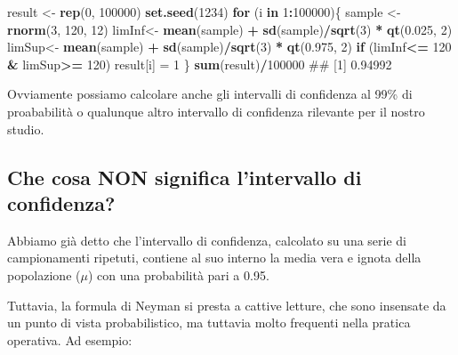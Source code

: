 \documentclass[a4paper,12pt,oneside]{book}
\newenvironment{Shaded}{\begin{snugshade}}{\end{snugshade}}
\newcommand{\KeywordTok}[1]{\textcolor[rgb]{0.13,0.29,0.53}{\textbf{#1}}}
\newcommand{\DecValTok}[1]{\textcolor[rgb]{0.00,0.00,0.81}{#1}}
\newcommand{\FloatTok}[1]{\textcolor[rgb]{0.00,0.00,0.81}{#1}}
\newcommand{\StringTok}[1]{\textcolor[rgb]{0.31,0.60,0.02}{#1}}
\newcommand{\ControlFlowTok}[1]{\textcolor[rgb]{0.13,0.29,0.53}{\textbf{#1}}}
\newcommand{\OperatorTok}[1]{\textcolor[rgb]{0.81,0.36,0.00}{\textbf{#1}}}
\newcommand{\NormalTok}[1]{#1}
\theoremstyle{definition}
\theoremstyle{definition}
\theoremstyle{definition}
\theoremstyle{remark}
\begin{document}
\begin{Shaded}
\begin{Highlighting}[]
\NormalTok{result <-}\StringTok{ }\KeywordTok{rep}\NormalTok{(}\DecValTok{0}\NormalTok{, }\DecValTok{100000}\NormalTok{)}
\KeywordTok{set.seed}\NormalTok{(}\DecValTok{1234}\NormalTok{)}
\ControlFlowTok{for}\NormalTok{ (i }\ControlFlowTok{in} \DecValTok{1}\OperatorTok{:}\DecValTok{100000}\NormalTok{)\{}
\NormalTok{  sample <-}\StringTok{ }\KeywordTok{rnorm}\NormalTok{(}\DecValTok{3}\NormalTok{, }\DecValTok{120}\NormalTok{, }\DecValTok{12}\NormalTok{)}
\NormalTok{  limInf<-}\StringTok{ }\KeywordTok{mean}\NormalTok{(sample) }\OperatorTok{+}\StringTok{ }\KeywordTok{sd}\NormalTok{(sample)}\OperatorTok{/}\KeywordTok{sqrt}\NormalTok{(}\DecValTok{3}\NormalTok{) }\OperatorTok{*}\StringTok{ }\KeywordTok{qt}\NormalTok{(}\FloatTok{0.025}\NormalTok{, }\DecValTok{2}\NormalTok{) }
\NormalTok{  limSup<-}\StringTok{ }\KeywordTok{mean}\NormalTok{(sample) }\OperatorTok{+}\StringTok{ }\KeywordTok{sd}\NormalTok{(sample)}\OperatorTok{/}\KeywordTok{sqrt}\NormalTok{(}\DecValTok{3}\NormalTok{) }\OperatorTok{*}\StringTok{ }\KeywordTok{qt}\NormalTok{(}\FloatTok{0.975}\NormalTok{, }\DecValTok{2}\NormalTok{) }
  \ControlFlowTok{if}\NormalTok{ (limInf}\OperatorTok{<=}\StringTok{ }\DecValTok{120} \OperatorTok{&}\StringTok{ }\NormalTok{limSup}\OperatorTok{>=}\StringTok{ }\DecValTok{120}\NormalTok{) result[i] =}\StringTok{ }\DecValTok{1}
\NormalTok{\}}
\KeywordTok{sum}\NormalTok{(result)}\OperatorTok{/}\DecValTok{100000}
\NormalTok{## [1] 0.94992}
\end{Highlighting}
\end{Shaded}

Ovviamente possiamo calcolare anche gli intervalli di confidenza al 99\%
di proababilità o qualunque altro intervallo di confidenza rilevante per
il nostro studio.

\subsection{Che cosa NON significa l'intervallo di
confidenza?}\label{che-cosa-non-significa-lintervallo-di-confidenza}

Abbiamo già detto che l'intervallo di confidenza, calcolato su una serie
di campionamenti ripetuti, contiene al suo interno la media vera e
ignota della popolazione (\(\mu\)) con una probabilità pari a 0.95.

Tuttavia, la formula di Neyman si presta a cattive letture, che sono
insensate da un punto di vista probabilistico, ma tuttavia molto
frequenti nella pratica operativa. Ad esempio:
\end{document}
